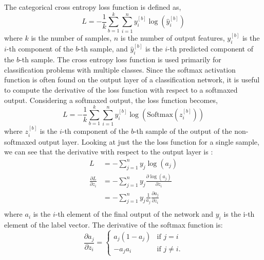 \documentclass[twocolumn,pra,floatfix]{revtex4-2}
\begin{document}
                The categorical cross entropy loss function is defined as,
                \begin{equation}
                    L = -\frac{1}{k} \sum_{b=1}^{k} \sum_{i=1}^{n} y_{i}^{[b]} \log(\hat{y}_{i}^{[b]})
                \end{equation}
                where $k$ is the number of samples, $n$ is the number of output features, $y_{i}^{[b]}$ is the $i$-th component of the $b$-th sample, and $\hat{y}_{i}^{[b]}$ is the $i$-th predicted component of the $b$-th sample. The cross entropy loss function is used primarily for classification problems with multiple classes. Since the softmax activation function is often found on the output layer of a classification network, it is useful to compute the derivative of the loss function with respect to a softmaxed output. Considering a softmaxed output, the loss function becomes,
                \begin{equation}
                    L = -\frac{1}{k}\sum_{b=1}^{k}\sum_{i=1}^{n}y_{i}^{[b]}\log(\text{Softmax}(z^{[b]}_{i}))
                \end{equation}
                where $z^{[b]}_{i}$ is the $i$-th component of the $b$-th sample of the output of the non-softmaxed output layer. Looking at just the the loss function for a single sample, we can see that the derivative with respect to the output layer is \cite{Kurbiel2021}:
                \begin{align*}
                    L &= -\sum_{j=1}^{n}y_{j}\log(a_{j}) \\
                    \frac{\partial L}{\partial z_{i}} &= - \sum_{j=1}^{n}y_{j}\frac{\partial
                    \log(a_{j})}{\partial z_{i}} \\
                    &= - \sum_{j=1}^{n}y_{j}\frac{1}{a_{j}}\frac{\partial a_{j}}{\partial z_{i}} \\
                \end{align*}
                where $a_i$ is the $i$-th element of the final output of the network and $y_i$ is the i-th element of the label vector. The derivative of the softmax function is:
                \begin{equation}
                    \frac{\partial a_{j}}{\partial z_{i}} = \begin{cases}
                        a_{j}(1-a_{j}) & \text{if } j = i \\
                        -a_{j}a_{i} & \text{if } j \neq i.
                    \end{cases}
                \end{equation}
\end{document}
